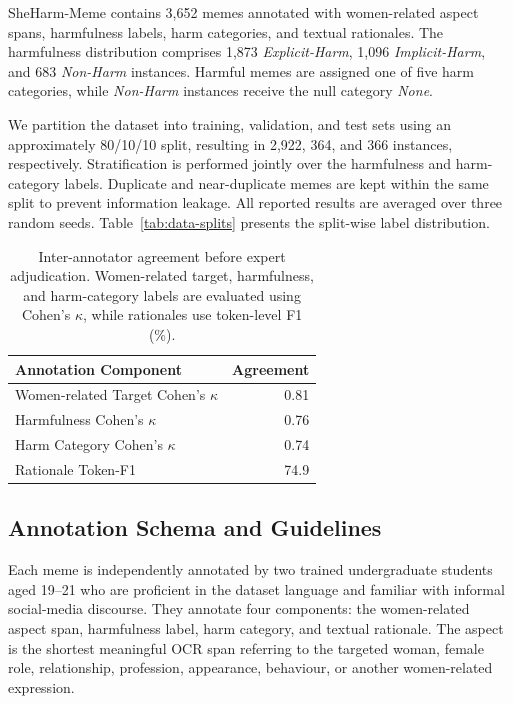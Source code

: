 \documentclass[11pt]{article}
\begin{document}
SheHarm-Meme contains 3,652 memes annotated with women-related aspect
spans, harmfulness labels, harm categories, and textual rationales.
The harmfulness distribution comprises 1,873
\textit{Explicit-Harm}, 1,096 \textit{Implicit-Harm}, and 683
\textit{Non-Harm} instances. Harmful memes are assigned one of five
harm categories, while \textit{Non-Harm} instances receive the null
category \textit{None}.

We partition the dataset into training, validation, and test sets
using an approximately 80/10/10 split, resulting in 2,922, 364, and
366 instances, respectively. Stratification is performed jointly over
the harmfulness and harm-category labels. Duplicate and near-duplicate
memes are kept within the same split to prevent information leakage.
All reported results are averaged over three random seeds.
Table~\ref{tab:data-splits} presents the split-wise label
distribution.
\begin{table}[t]
\centering
\small
\setlength{\tabcolsep}{5pt}
\renewcommand{\arraystretch}{1.05}
\begin{tabular}{lr}
\toprule
\textbf{Annotation Component} & \textbf{Agreement} \\
\midrule
Women-related Target Cohen's $\kappa$ & 0.81 \\

Harmfulness Cohen's $\kappa$
& 0.76 \\

Harm Category Cohen's $\kappa$
& 0.74 \\

Rationale Token-F1
& 74.9 \\
\bottomrule
\end{tabular}
\caption{Inter-annotator agreement before expert adjudication.
Women-related target, harmfulness, and harm-category labels are
evaluated using Cohen's $\kappa$, while rationales use token-level
F1 (\%).}
\label{tab:annotation-agreement}
\end{table}
\subsection{Annotation Schema and Guidelines}
\label{subsec:annotation}

Each meme is independently annotated by two trained undergraduate
students aged 19--21 who are proficient in the dataset language and
familiar with informal social-media discourse. They annotate four
components: the women-related aspect span, harmfulness label, harm
category, and textual rationale. The aspect is the shortest meaningful
OCR span referring to the targeted woman, female role, relationship,
profession, appearance, behaviour, or another women-related
expression.
\end{document}
